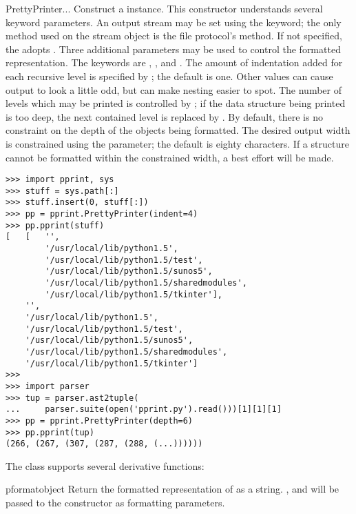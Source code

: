 \begin{classdesc}{PrettyPrinter}{...}
Construct a  instance.  This constructor
understands several keyword parameters.  An output stream may be set
using the  keyword; the only method used on the stream
object is the file protocol's  method.  If not
specified, the  adopts .  Three
additional parameters may be used to control the formatted
representation.  The keywords are , , and
.  The amount of indentation added for each recursive level
is specified by ; the default is one.  Other values can
cause output to look a little odd, but can make nesting easier to
spot.  The number of levels which may be printed is controlled by
; if the data structure being printed is too deep, the next
contained level is replaced by .  By default, there is no
constraint on the depth of the objects being formatted.  The desired
output width is constrained using the  parameter; the
default is eighty characters.  If a structure cannot be formatted
within the constrained width, a best effort will be made.

\begin{verbatim}
>>> import pprint, sys
>>> stuff = sys.path[:]
>>> stuff.insert(0, stuff[:])
>>> pp = pprint.PrettyPrinter(indent=4)
>>> pp.pprint(stuff)
[   [   '',
        '/usr/local/lib/python1.5',
        '/usr/local/lib/python1.5/test',
        '/usr/local/lib/python1.5/sunos5',
        '/usr/local/lib/python1.5/sharedmodules',
        '/usr/local/lib/python1.5/tkinter'],
    '',
    '/usr/local/lib/python1.5',
    '/usr/local/lib/python1.5/test',
    '/usr/local/lib/python1.5/sunos5',
    '/usr/local/lib/python1.5/sharedmodules',
    '/usr/local/lib/python1.5/tkinter']
>>>
>>> import parser
>>> tup = parser.ast2tuple(
...     parser.suite(open('pprint.py').read()))[1][1][1]
>>> pp = pprint.PrettyPrinter(depth=6)
>>> pp.pprint(tup)
(266, (267, (307, (287, (288, (...))))))
\end{verbatim}
\end{classdesc}



The  class supports several derivative functions:

\begin{funcdesc}{pformat}{object}
Return the formatted representation of  as a string.  ,
 and  will be passed to the 
constructor as formatting parameters.
\end{funcdesc}

